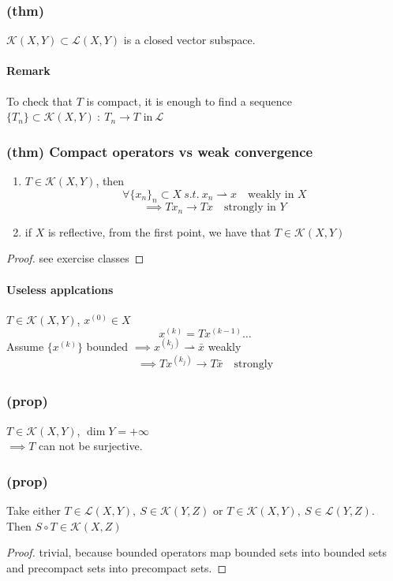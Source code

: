 \subsubsection{(thm)}
$\mathcal K(X,Y)\subset \mathcal L(X,Y)$ is a closed vector subspace.
\paragraph{Remark}
To check that $T$ is compact, it is enough to find a sequence $\{ T_n\}\subset \mathcal K(X,Y)\ : \ T_n\to T \text{ in}  \ \mathcal L$
\subsubsection{(thm) Compact operators vs weak convergence}
\begin{enumerate}
    \item  $T\in \mathcal K(X,Y)$, then $$\forall \{x_n\}_n\subset X \ s.t. \ x_n\rightharpoonup x \quad \text{weakly in }X$$
    $$\implies Tx_n\to Tx \quad \text{strongly in } Y$$
    \item if $X$ is reflective, from the first point, we have that $T\in \mathcal K(X,Y)$
\end{enumerate}
\begin{proof}
    see exercise classes
\end{proof}
\paragraph{Useless applcations}
$T\in \mathcal K(X,Y)$,
$x^{(0)}\in X$
$$x^{(k)}=Tx^{(k-1)}\dots$$
Assume $\{ x^{(k)}\}$ bounded $\implies x^{(k_j)}\rightharpoonup \bar x$ weakly\\
$$\implies Tx^{(k_j)}\xrightarrow[]{}T\bar x\quad \text{strongly}$$
\subsubsection{(prop)}
$T\in \mathcal K(X,Y)$, $\dim Y=+\infty$\\
$\implies T$ can not be surjective.
\subsubsection{(prop)}
Take either $T\in \mathcal L(X,Y), \ S\in \mathcal K(Y,Z)$ or $T\in \mathcal K(X,Y), \ S\in \mathcal L(Y,Z)$.\\
Then $S\circ T\in \mathcal K(X,Z)$
\begin{proof}
    trivial, because bounded operators map bounded sets into bounded sets and precompact sets into precompact sets.
\end{proof}
